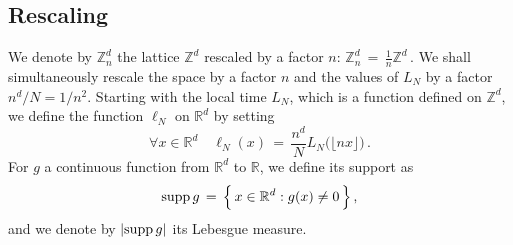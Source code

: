 \documentclass[10pt]{amsart}
\theoremstyle{definition}\newtheorem{defi}[theo]{Definition}\newtheorem{rema}[theo]{Remark}\newtheorem{exam}[theo]{Example}\newtheorem{exem}[theo]{Example}\newtheorem{nota}[theo]{Notation}
\newcommand*\supp{\text{supp\,}}
\newcommand*\Z {{\mathbb Z}}
\newcommand*\Zd {{\mathbb Z^d}}
\newcommand*\Rd {{\mathbb R^d}}
\newcommand*\Znd {{\mathbb Z_n^d}}
\newcommand*\R{\mathbb{R}}
\let\oldforall\forall
\renewcommand*{\forall}{\mathrel{\oldforall}}
\begin{document}
\subsection{Rescaling}
We denote by $\Znd$ the lattice $\Zd$ rescaled by a factor $n$: $\Znd\,=\,\frac{1}{n}\Z^d\,.$ We shall simultaneously rescale the space by a factor $n$ and the values of $L_N$ by a factor $n^d/N = 1/ n^2$. Starting with the local time $L_N$, which is a function defined on $\Zd$, we define the function $\ell_N$ on $\Rd$ by setting
\begin{equation}\label{D:rescaledLN}
\forall x\in\Rd\quad \ell_N(x)\,=\,
\frac{n^d}{N}{L_N\big(\lfloor nx\rfloor\big)}\,.
\end{equation}
For $g$ a continuous function from $\Rd$ to $\R$, we define its support as
\[
\supp g\,=\,
\Big\{\,x\in \Rd: g(x)\neq 0
\,\Big\}\,,
\]
and we denote by $|\supp g|$ its Lebesgue measure.
\end{document}
